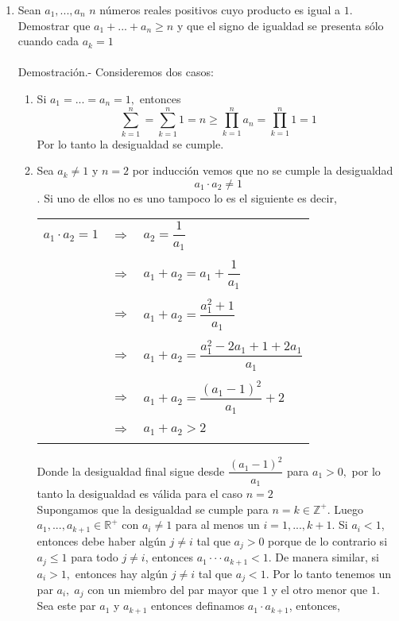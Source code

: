 \begin{enumerate}[ \bfseries 1.]
\item Sean $a_1,...,a_n$  $n$ números reales positivos cuyo producto es igual a $1$. Demostrar que $a_1+...+a_n \geq n$ y que el signo de igualdad se presenta sólo cuando cada $a_k =1$\\\\
Demostración.- \; Consideremos dos casos:
\begin{enumerate}[C1]
\item Si $a_1=...=a_n=1,$ entonces 
$$\sum\limits_{k=1}^n = \sum\limits_{k=1}^n 1 = n \geq \prod\limits_{k=1}^n a_n = \prod\limits_{k=1}^n 1 = 1 $$
Por lo tanto la desigualdad se cumple.
\item Sea $a_k \neq 1$ y $n=2$ por inducción vemos que no se cumple la desigualdad $$a_1 \cdot a_2 \neq 1$$. Si uno de ellos no es uno tampoco lo es el siguiente es decir,
\begin{center}
\begin{tabular}{rcl}
$a_1 \cdot a_2 = 1$&$\Rightarrow$&$a_2 = \dfrac{1}{a_1}$\\\\
&$\Rightarrow$&$a_1 + a_2 = a_1 + \dfrac{1}{a_1}$\\\\
&$\Rightarrow$&$a_1 + a_2=\dfrac{a_1^2 + 1}{a_1}$\\\\
&$\Rightarrow$&$a_1 + a_2=\dfrac{a_1^2 - 2a_1 + 1 +2a_1}{a_1}$\\\\
&$\Rightarrow$&$a_1 + a_2=\dfrac{(a_1 - 1)^2}{a_1} + 2$\\\\
&$\Rightarrow$&$a_1 + a_2 > 2$\\\\
\end{tabular}
\end{center}
Donde la desigualdad final sigue desde $\dfrac{(a_1-1)^2}{a_1}$ para $a_1>0,$ por lo tanto la desigualdad es válida para el caso $n=2$\\
Supongamos que la desigualdad se cumple para $n=k \in \mathbb{Z}^+$. Luego $a_1,...,a_{k+1} \in \mathbb{R}^+$ con $a_i \neq 1$ para al menos un $i=1,...,k+1.$ Si $a_i < 1$, entonces debe haber algún $j\neq i$ tal que $a_j > 0$ porque de lo contrario si $a_j \leq 1$ para  todo $j\neq i$, entonces $a_1 \cdot \cdot \cdot a_{k+1}<1.$ De manera similar, si $a_i>1,$ entonces hay algún $j\neq i$ tal que $a_j <1.$ Por lo tanto tenemos un par $a_i, \; a_j$ con un miembro del par mayor que $1$ y el otro menor que $1$. Sea este par $a_1$ y $a_{k+1}$ entonces definamos $a_1 \cdot a_{k+1}$, entonces,

\end{enumerate}
\end{enumerate}
